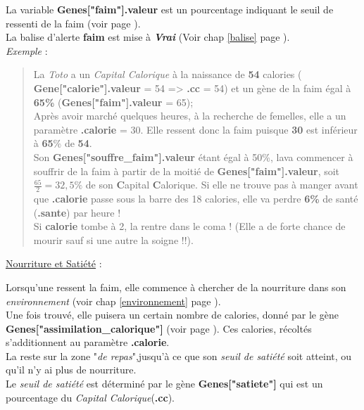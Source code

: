 \documentclass[french]{report}
\newlength{\du}\fi
\begin{document}
La variable \textbf{Genes["faim"].valeur} est un pourcentage indiquant le seuil de ressenti de la faim (voir page \pageref{liste_gene}).\\
La balise d'alerte \textbf{faim} est mise à \textbf{\textit{Vrai}} (Voir chap \ref{balise} page \pageref{balise}).\\

\textit{Exemple} :\\
\begin{quote}
	La \CoCiX \emph{Toto} a un \textit{Capital Calorique} à la naissance de \textbf{54} calories ( \textbf{Gene["calorie"].valeur} = 54 => \textbf{.cc} = 54) et un gène de la faim égal à \textbf{65\%} (\textbf{Genes["faim"].valeur} = 65); \\
	
	Après avoir marché quelques heures, à la recherche de femelles, elle a un paramètre \textbf{.calorie} = 30. Elle ressent donc la faim puisque \textbf{30} est inférieur à \textbf{65}\% de \textbf{54}.\\
	
	Son \textbf{Genes["souffre\_faim"].valeur} étant égal à 50\%, la\CoCiX va commencer à souffrir de la faim à partir de la moitié de \textbf{Genes["faim"].valeur}, soit $\frac{65}{2} = 32,5\%$ de son \textbf{C}apital \textbf{C}alorique. Si elle ne trouve pas à manger avant que \textbf{.calorie} passe sous la barre des 18 calories, elle va perdre \textbf{6\%} de santé (\textbf{.sante}) par heure !\\
	
	Si \textbf{calorie} tombe à 2, la \CoCiX  rentre dans le coma ! (Elle a de forte chance de mourir sauf si une autre \CoCiX la soigne !!).
\end{quote}


\begin{center}
	\underline{Nourriture et Satiété} :\label{nourrir}
\end{center}
Lorsqu'une \CoCiX ressent la faim, elle commence à chercher de la nourriture dans son \textit{environnement} (voir chap \ref{environnement} page \pageref{environnement}).\\
Une fois trouvé, elle puisera un certain nombre de calories, donné par le gène\\ \textbf{Genes["assimilation\_calorique"]} (voir page \pageref{liste_gene}). Ces calories, récoltés s'additionnent au paramètre \textbf{.calorie}.\\

La \CoCiX reste sur la zone "\textit{de repas}",jusqu'à ce que son \textit{seuil de satiété} soit atteint, ou qu'il n'y ai plus de nourriture.\\
Le \textit{seuil de satiété} est déterminé par le gène \textbf{Genes["satiete"]} qui est un pourcentage du \textit{Capital Calorique}(\textbf{.cc}).\\
\end{document}
